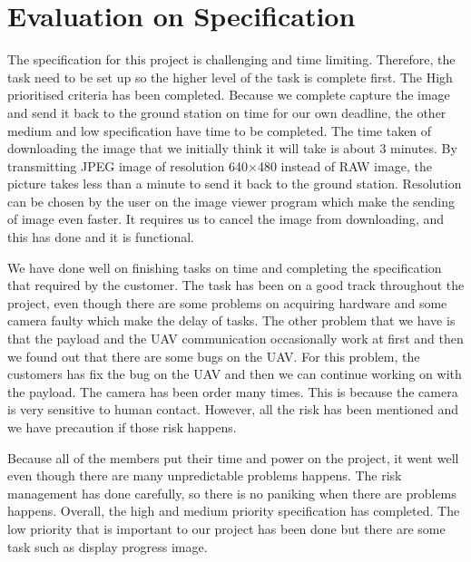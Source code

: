 \section{Evaluation on Specification}

The specification for this project is challenging and time limiting.
Therefore, the task need to be set up so the higher level of the task is complete first.
The High prioritised criteria has been completed. 
Because we complete capture the image and send it back to the ground station on time for our own deadline, the other medium and low specification have time to be completed.
The time taken of downloading the image that we initially think it will take is about 3 minutes.
By transmitting JPEG image of resolution 640$\times$480 instead of RAW image, the picture takes less than a minute to send it back to the ground station.
Resolution can be chosen by the user on the image viewer program which make the sending of image even faster.
It requires us to cancel the image from downloading, and this has done and it is functional.

We have done well on finishing tasks on time and completing the specification that required by the customer.
The task has been on a good track throughout the project, even though there are some problems on acquiring hardware and some camera faulty which make the delay of tasks.
The other problem that we have is that the payload and the UAV communication occasionally work at first and then we found out that there are some bugs on the UAV.
For this problem, the customers has fix the bug on the UAV and then we can continue working on with the payload.
The camera has been order many times.
This is because the camera is very sensitive to human contact.
However, all the risk has been mentioned and we have precaution if those risk happens.

Because all of the members put their time and power on the project, it went well even though there are many unpredictable problems happens. The risk management has done carefully, so there is no paniking when there are problems happens. Overall, the high and medium priority specification has completed. The low priority that is important to our project has been done but there are some task such as display progress image.





